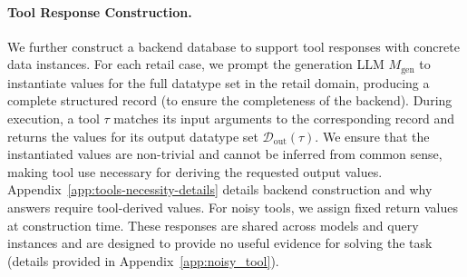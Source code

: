 \documentclass{llmxive}
\begin{document}

\paragraph{Tool Response Construction.}
We further construct a backend database to support tool responses with concrete data instances. 
For each retail case, we prompt the generation LLM $M_{\mathrm{gen}}$ to instantiate values for the full datatype set in the retail domain, producing a complete structured record (to ensure the completeness of the backend). 
During execution, a tool $\tau$ matches its input arguments to the corresponding record and returns the values for its output datatype set $\mathcal{D}_{\mathrm{out}}(\tau)$.
We ensure that the instantiated values are non-trivial and cannot be inferred from common sense, making tool use necessary for deriving the requested output values.
Appendix~\ref{app:tools-necessity-details} details backend construction and why answers require tool-derived values.
For noisy tools, we assign fixed return values at construction time. These responses are shared across models and query instances and are designed to provide no useful evidence for solving the task (details provided in Appendix~\ref{app:noisy_tool}).


\end{document}
